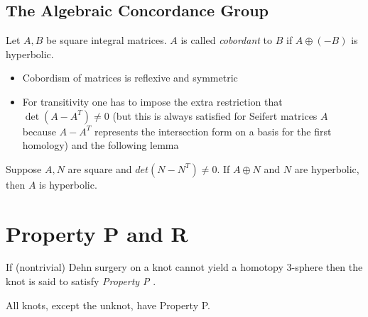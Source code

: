 \newpage

\subsection{The Algebraic Concordance Group}

\begin{definition}
	Let $A, B$ be square integral matrices.
	$A$ is called \textit{cobordant}  to $B$
	if $A \oplus (-B)$ is hyperbolic.
\end{definition}

\begin{remark}
	\begin{itemize}
		\item Cobordism of matrices is reflexive and symmetric
		\item For transitivity one has to impose the extra restriction that
		$\det(A - A^{T}) \ne 0$ (but this is always satisfied for Seifert matrices
		$A$ because $A - A^{T}$ represents the intersection form on a basis for the
		first homology) and the following lemma
	\end{itemize}
\end{remark}

\begin{lemma}
	Suppose $A, N$ are square and $det(N - N^{T}) \ne 0$.
	If $A \oplus N$ and $N$ are hyperbolic, then $A$ is hyperbolic.
\end{lemma}



\newpage
\section{Property P and R}

\begin{definition}
	If (nontrivial) Dehn surgery on a knot
	cannot yield a homotopy $3$-sphere
	then the knot is said to satisfy
	\textit{Property P} .
\end{definition}

\begin{theorem}
	All knots, except the unknot, have Property P.
\end{theorem}

